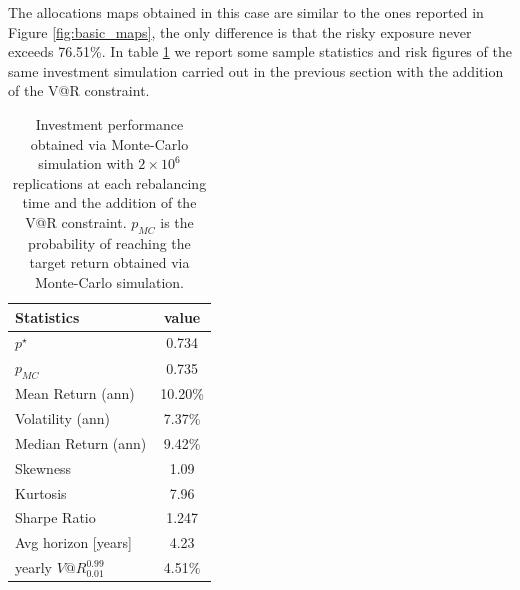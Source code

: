 The allocations maps obtained in this case are similar to the ones reported in Figure \ref{fig:basic_maps}, the only difference is that the risky exposure never exceeds 76.51\%.
In table \ref{tab:performance_VaRbasic} we report some sample statistics and risk figures of the same investment simulation carried out in the previous section with the addition of the V@R constraint.



\begin{table}[]
	\centering
	\begin{tabular}{@{}lc@{}}
		\toprule
		Statistics & value  \\
		\midrule
		$p^{\star}$ & 0.734\\
		\addlinespace[0.5em]	
		$p_{MC}$ & 0.735\\
		\addlinespace[0.5em]
		Mean Return (ann) & 10.20\%\\
		\addlinespace[0.5em]
		Volatility (ann) & 7.37\%\\
		\addlinespace[0.5em]
		Median Return (ann) & 9.42\%\\
		\addlinespace[0.5em]
		Skewness & 1.09\\
		\addlinespace[0.5em]
		Kurtosis & 7.96\\
		\addlinespace[0.5em]
		Sharpe Ratio & 1.247\\
		\addlinespace[0.5em]
		Avg horizon [years] & 4.23 \\
		\addlinespace[0.5em]
		yearly $V@R^{0.99}_{0.01}$ & 4.51\%\\	
		\bottomrule
	\end{tabular}
	\caption{Investment performance obtained via Monte-Carlo simulation with $2\times10^6$ replications at each rebalancing time and the addition of the V@R constraint. $p_{MC}$ is the probability of reaching the target return obtained via Monte-Carlo simulation.}
	\label{tab:performance_VaRbasic}
\end{table}



